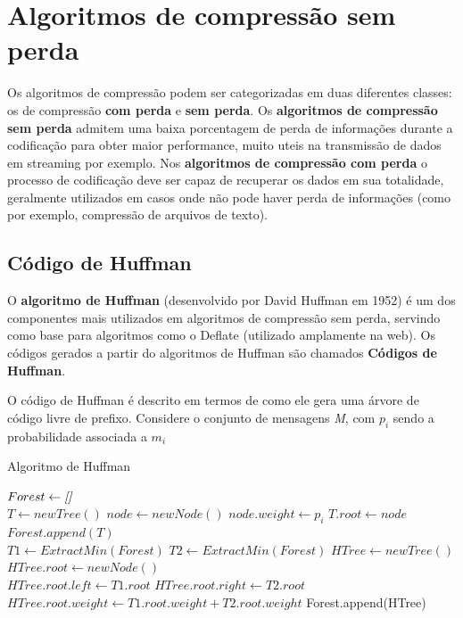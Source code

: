 \chapter{Algoritmos de compressão sem perda}

Os algoritmos de compressão podem ser categorizadas em duas diferentes classes: os de compressão \textbf{com perda} e \textbf{sem perda}. 
Os \textbf{algoritmos de compressão sem perda} admitem uma baixa porcentagem de perda de informações durante a codificação para obter maior performance, muito uteis na transmissão de dados em streaming por exemplo. 
Nos \textbf{algoritmos de compressão com perda} o processo de codificação deve ser capaz de recuperar os dados em sua totalidade, geralmente utilizados em casos onde não pode haver perda de informações (como por exemplo, compressão de arquivos de texto).

\pagebreak

\section{Código de Huffman} \label{sec:huff}
O \textbf{algoritmo de Huffman} (desenvolvido por David Huffman em 1952) é um dos componentes mais utilizados em algoritmos de compressão sem perda, servindo como base para algoritmos como o Deflate (utilizado amplamente na web).
Os códigos gerados a partir do algoritmos de Huffman são chamados \textbf{Códigos de Huffman}.

O código de Huffman é descrito em termos de como ele gera uma árvore de código livre de prefixo. 
Considere o conjunto de mensagens \emph{M}, com $p_i$ sendo a probabilidade associada a $m_i$

\begin{algorithm}[H]
\caption{Algoritmo de Huffman} \label{alg:huff}
\begin{algorithmic}
	\State $Forest \gets \emph{[]}$\\
	 
		\State $T \gets newTree()$
		\State $node \gets newNode()$
		\State $node.weight \gets p_i$ 
		\State $T.root \gets node$
		\State $Forest.append(T)$ 
	\EndFor \\
	
		\State $T1 \gets ExtractMin(Forest)$ 
		\State $T2 \gets ExtractMin(Forest)$
		\State $HTree \gets newTree()$
		\State $HTree.root \gets newNode()$ \\
		\State $HTree.root.left \gets T1.root$
		\State $HTree.root.right \gets T2.root$
		\State $HTree.root.weight \gets T1.root.weight + T2.root.weight$
		\State Forest.append(HTree) 
	\EndWhile
\end{algorithmic}
\end{algorithm}

